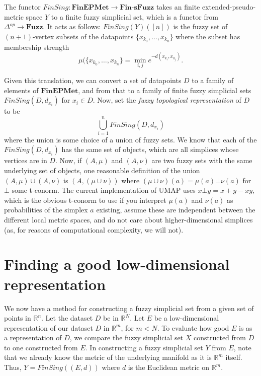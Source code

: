 \documentclass[a4paper,11pt,leqno]{article}
\newcommand{\RR}{\mathbb{R}}
\theoremstyle{definition}
\begin{document}
The functor $FinSing: \textbf{FinEPMet}\to \textbf{Fin-sFuzz}$ takes an finite extended-pseudo-metric space $Y$ to a finite fuzzy simplicial set, which is a functor from $\Delta^{op}\to \textbf{Fuzz}$.
It acts as follows: $FinSing(Y)([n])$ is the fuzzy set of $(n+1)$-vertex subsets of the datapoints $\{x_{k_0},\ldots,x_{k_n}\}$ where the subset has membership strength $$\mu(\{x_{k_0},\ldots,x_{k_n}\} = \min_{i, j} e^{-d(x_{k_i}, x_{k_j})}.$$

Given this translation, we can convert a set of datapoints $D$ to a family of elements of $\textbf{FinEPMet}$, and from that to a family of finite fuzzy simplicial sets $FinSing(D, d_{x_i})$ for $x_i\in D$.
Now, set the \emph{fuzzy topological representation} of $D$ to be
$$\bigcup_{i=1}^n FinSing(D, d_{x_i})$$
where the union is some choice of a union of fuzzy sets.
We know that each of the $FinSing(D, d_{x_i})$ has the same set of objects, which are all simplices whose vertices are in $D$.
Now, if $(A, \mu)$ and $(A, \nu)$ are two fuzzy sets with the same underlying set of objects, one reasonable definition of the union $(A, \mu) \cup (A, \nu)$ is $(A, (\mu\cup\nu))$ where $(\mu\cup\nu)(a) = \mu(a) \bot \nu(a)$ for $\bot$ some t-conorm.
The current implementation of UMAP uses $x\bot y = x+y-xy$, which is the obvious t-conorm to use if you interpret $\mu(a)$ and $\nu(a)$ as probabilities of the simplex $a$ existing, assume these are independent between the different local metric spaces, and do not care about higher-dimensional simplices (as, for reasons of computational complexity, we will not).

\section{Finding a good low-dimensional representation}

We now have a method for constructing a fuzzy simplicial set from a given set of points in $\RR^n$.
Let the dataset $D$ be in $\RR^N$.
Let $E$ be a low-dimensional representation of our dataset $D$ in $\RR^m$, for $m < N$.
To evaluate how good $E$ is as a representation of $D$, we compare the fuzzy simplicial set $X$ constructed from $D$ to one constructed from $E$.
In constructing a fuzzy simplicial set $Y$ from $E$, note that we already know the metric of the underlying manifold as it is $\RR^m$ itself.
Thus, $Y = FinSing((E, d))$ where $d$ is the Euclidean metric on $\RR^m$. 
\end{document}
